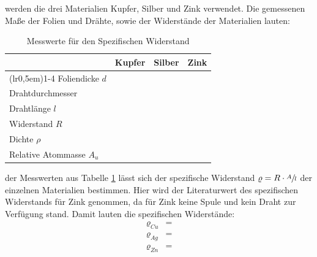 \justifying werden die drei Materialien Kupfer, Silber und Zink verwendet. 
 Die gemessenen Maße der Folien und Drähte, sowie der Widerstände der Materialien lauten:

\begin{table}[H]
\centering
    \begin{tabular}{l r r r}
    \toprule
        \multicolumn{1}{c}{} & \multicolumn{1}{c}{Kupfer} & \multicolumn{1}{c}{Silber} & \multicolumn{1}{c}{Zink}\\
        \cmidrule(lr{0,5em}){1-4}
        Foliendicke $d$        & \text{}   & \text{}   & \text{}\\
        Drahtdurchmesser    & \text{}   & \text{}   & \text{}\\
        Drahtlänge $l$         & \text{}         & \text{}         & \text{}\\
        Widerstand $R$         & \text{}         & \text{}         & \text{}\\
        Dichte  $\rho$            & \text{}    & \text{}    & \text{}\\
        Relative Atommasse $A_u$      & \text{} & \text{} & \text{}\\
        \bottomrule
    \end{tabular}
\caption{Messwerte für den Spezifischen Widerstand}
\label{tab:1}
\end{table}

\justifying der Messwerten aus Tabelle \ref{tab:1} lässt sich der spezifische Widerstand $\varrho = R \cdot \sfrac{A}{l}$
der einzelnen Materialien bestimmen. Hier wird der Literaturwert des spezifischen Widerstands für Zink \cite{SpWiderstand_Zn} genommen, da für 
Zink keine Spule und kein Draht zur Verfügung stand. Damit lauten die spezifischen Widerstände:
\begin{subequations} \label{eq:15}
\begin{align}
    \varrho_{Cu} &= \text{} \label{eq:15a}\\
    \varrho_{Ag} &= \text{} \label{eq:15b}\\
    \varrho_{Zn} &= \text{} \label{eq:15c}
\end{align}
\end{subequations}

